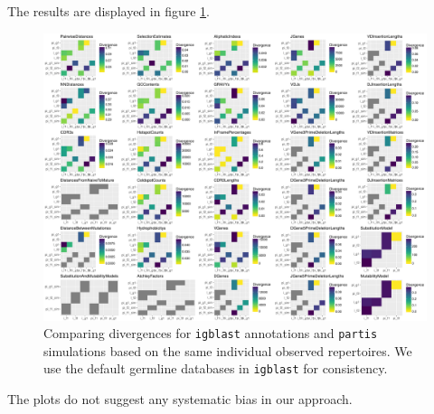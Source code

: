 \documentclass{article}
\begin{document}
The results are displayed in figure \ref{PartisIgb}.
\begin{figure}
    \includegraphics[width=\linewidth]{Figures/partis_igb.pdf}
    \caption{Comparing divergences for \texttt{igblast} annotations and \texttt{partis} simulations based on the same individual observed repertoires.
        We use the default germline databases in \texttt{igblast} for consistency.
    }
    \label{PartisIgb}
\end{figure}
The plots do not suggest any systematic bias in our approach.
\end{document}
